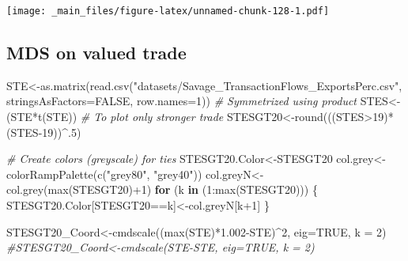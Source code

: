 \documentclass[
  notitlepage,
  onecolumn,
  openany]{book}
\newenvironment{Shaded}{\begin{snugshade}}{\end{snugshade}}
\newcommand{\AttributeTok}[1]{\textcolor[rgb]{0.77,0.63,0.00}{#1}}
\newcommand{\CommentTok}[1]{\textcolor[rgb]{0.56,0.35,0.01}{\textit{#1}}}
\newcommand{\ConstantTok}[1]{\textcolor[rgb]{0.00,0.00,0.00}{#1}}
\newcommand{\ControlFlowTok}[1]{\textcolor[rgb]{0.13,0.29,0.53}{\textbf{#1}}}
\newcommand{\DecValTok}[1]{\textcolor[rgb]{0.00,0.00,0.81}{#1}}
\newcommand{\FloatTok}[1]{\textcolor[rgb]{0.00,0.00,0.81}{#1}}
\newcommand{\FunctionTok}[1]{\textcolor[rgb]{0.00,0.00,0.00}{#1}}
\newcommand{\NormalTok}[1]{#1}
\newcommand{\OtherTok}[1]{\textcolor[rgb]{0.56,0.35,0.01}{#1}}
\newcommand{\SpecialCharTok}[1]{\textcolor[rgb]{0.00,0.00,0.00}{#1}}
\newcommand{\StringTok}[1]{\textcolor[rgb]{0.31,0.60,0.02}{#1}}
\begin{document}
\texttt{[image: \_main\_files/figure-latex/unnamed-chunk-128-1.pdf]}

\hypertarget{mds-on-valued-trade}{%
\subsection{MDS on valued trade}\label{mds-on-valued-trade}}

\begin{Shaded}
\begin{Highlighting}[]
\NormalTok{STE}\OtherTok{\textless{}{-}}\FunctionTok{as.matrix}\NormalTok{(}\FunctionTok{read.csv}\NormalTok{(}\StringTok{"datasets/Savage\_TransactionFlows\_ExportsPerc.csv"}\NormalTok{,}
                        \AttributeTok{stringsAsFactors=}\ConstantTok{FALSE}\NormalTok{, }\AttributeTok{row.names=}\DecValTok{1}\NormalTok{))}
\CommentTok{\# Symmetrized using product}
\NormalTok{STES}\OtherTok{\textless{}{-}}\NormalTok{(STE}\SpecialCharTok{*}\FunctionTok{t}\NormalTok{(STE))}
\CommentTok{\# To plot only stronger trade }
\NormalTok{STESGT20}\OtherTok{\textless{}{-}}\FunctionTok{round}\NormalTok{(((STES}\SpecialCharTok{\textgreater{}}\DecValTok{19}\NormalTok{)}\SpecialCharTok{*}\NormalTok{(STES}\DecValTok{{-}19}\NormalTok{))}\SpecialCharTok{\^{}}\NormalTok{.}\DecValTok{5}\NormalTok{)}

\CommentTok{\# Create colors (greyscale) for ties}
\NormalTok{STESGT20.Color}\OtherTok{\textless{}{-}}\NormalTok{STESGT20}
\NormalTok{col.grey}\OtherTok{\textless{}{-}}\FunctionTok{colorRampPalette}\NormalTok{(}\FunctionTok{c}\NormalTok{(}\StringTok{"grey80"}\NormalTok{, }\StringTok{"grey40"}\NormalTok{))}
\NormalTok{col.greyN}\OtherTok{\textless{}{-}}\FunctionTok{col.grey}\NormalTok{(}\FunctionTok{max}\NormalTok{(STESGT20)}\SpecialCharTok{+}\DecValTok{1}\NormalTok{)}
\ControlFlowTok{for}\NormalTok{ (k }\ControlFlowTok{in}\NormalTok{ (}\DecValTok{1}\SpecialCharTok{:}\FunctionTok{max}\NormalTok{(STESGT20)))}
\NormalTok{\{}
\NormalTok{    STESGT20.Color[STESGT20}\SpecialCharTok{==}\NormalTok{k]}\OtherTok{\textless{}{-}}\NormalTok{col.greyN[k}\SpecialCharTok{+}\DecValTok{1}\NormalTok{]}
\NormalTok{\}}

\NormalTok{STESGT20\_Coord}\OtherTok{\textless{}{-}}\FunctionTok{cmdscale}\NormalTok{((}\FunctionTok{max}\NormalTok{(STE)}\SpecialCharTok{*}\FloatTok{1.002}\SpecialCharTok{{-}}\NormalTok{STE)}\SpecialCharTok{\^{}}\DecValTok{2}\NormalTok{, }\AttributeTok{eig=}\ConstantTok{TRUE}\NormalTok{, }\AttributeTok{k =} \DecValTok{2}\NormalTok{)}
\CommentTok{\#STESGT20\_Coord\textless{}{-}cmdscale(STE{-}STE, eig=TRUE, k = 2)}


\end{Highlighting}
\end{Shaded}
\end{document}
